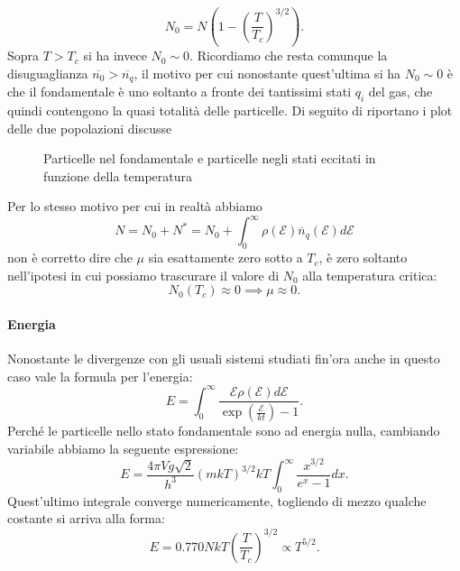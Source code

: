 \[
	N_0 = N\left( 1 -\left( \frac{T}{T_{c}} \right)^{3 /2}
 \right) 
.\] 
Sopra $T>T_{c}$ si ha invece $N_0 \sim 0$. Ricordiamo che resta comunque la disuguaglianza $\overline{n_0}>\overline{n_{q}}$, il motivo per cui nonostante quest'ultima si ha $N_0 \sim 0$ è che il fondamentale è uno soltanto a fronte dei tantissimi stati $q_{i}$ del gas, che quindi contengono la quasi totalità delle particelle. Di seguito di riportano i plot delle due popolazioni discusse
\begin{figure}[H]
    \centering
    \caption{Particelle nel fondamentale e particelle negli stati eccitati in funzione della temperatura}
    \label{fig:particelle-nel-fondamentale-e-particelle-negli-stati-eccitati-in-funzione-della-temperatura}
\end{figure}
\noindent
Per lo stesso motivo per cui in realtà abbiamo 
\[
	N = N_0 + N^{*}= N_0 + 
	\int_{0}^{\infty} 
	\rho ( \mathcal{E} )\overline{n}_{q}( \mathcal{E} ) 
	d\mathcal{E} 
\]
non è corretto dire che $\mu $ sia esattamente zero sotto a $T_{c}$, è zero soltanto nell'ipotesi in cui possiamo trascurare il valore di $N_0$ alla temperatura critica:
\[
	N_0( T_{c}) \approx 0 \implies \mu \approx 0
.\] 
\paragraph{Energia}
Nonostante le divergenze con gli usuali sistemi studiati fin'ora anche in questo caso vale la formula per l'energia:
\[
	E = \int_{0}^{\infty} 
	\frac{\mathcal{E} \rho ( \mathcal{E} ) d\mathcal{E} }
	{\exp\left( \frac{\mathcal{E} }{kt} \right) -1} 
.\] 
Perché le particelle nello stato fondamentale sono ad energia nulla, cambiando variabile abbiamo la seguente espressione:
\[
	E = \frac{4\pi V g \sqrt{2} }
	{h^3}\left( m k T \right) ^{3 /2} kT 
	\int_{0}^{\infty} \frac{x^{3 /2}}{e^{x}-1}dx  
.\] 
Quest'ultimo integrale converge numericamente, togliendo di mezzo qualche costante si arriva alla forma:
\[
	E = 0.770 NkT \left( \frac{T}{T_{c}} \right) ^{3 /2} \propto T^{5 /2}
.\] 
